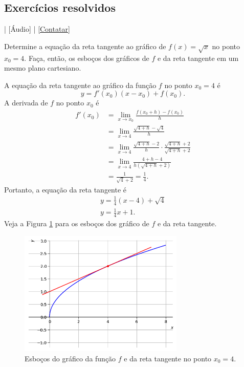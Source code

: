 \subsection*{Exercícios resolvidos}

\begin{flushright}
  [Vídeo] | [Áudio] | \href{https://phkonzen.github.io/notas/contato.html}{[Contatar]}
\end{flushright}

\begin{exeresol}
  Determine a equação da reta tangente ao gráfico de $f(x) = \sqrt{x}$ no ponto $x_0=4$. Faça, então, os esboços dos gráficos de $f$ e da reta tangente em um mesmo plano cartesiano.
\end{exeresol}
\begin{resol}
  A equação da reta tangente ao gráfico da função $f$ no ponto $x_0=4$ é
  \begin{equation}
    y = f'(x_0)(x-x_0)+f(x_0).
  \end{equation}
  A derivada de $f$ no ponto $x_0$ é
  \begin{align}
    f'(x_0) &= \lim_{x\to x_0} \frac{f(x_0+h)-f(x_0)}{h}\\
            &= \lim_{x\to 4} \frac{\sqrt{4+h}-\sqrt{4}}{h}\\
            &= \lim_{x\to 4} \frac{\sqrt{4+h}-2}{h} \cdot \frac{\sqrt{4+h}+2}{\sqrt{4+h}+2}\\
            &= \lim_{x\to 4} \frac{4+h-4}{h(\sqrt{4+h}+2)}\\
            &= \frac{1}{\sqrt{4}+2} = \frac{1}{4}.
  \end{align}
  Portanto, a equação da reta tangente é
  \begin{gather}
    y = \frac{1}{4}(x-4)+\sqrt{4} \\
    y = \frac{1}{4}x+1.
  \end{gather}
  Veja a Figura \ref{fig:cap_deriv_exeresol_rt_sqrt} para os esboços dos gráfico de $f$ e da reta tangente.

  \begin{figure}[H]
    \centering
    \includegraphics[width=0.7\textwidth]{./cap_deriv/dados/fig_cap_deriv_exeresol_rt_sqrt/fig_cap_deriv_exeresol_rt_sqrt}
    \caption{Esboços do gráfico da função $f$ e da reta tangente no ponto $x_0=4$.}
    \label{fig:cap_deriv_exeresol_rt_sqrt}
  \end{figure}
\end{resol}

